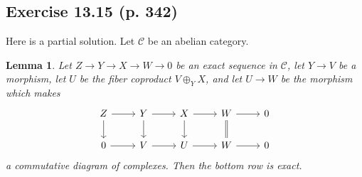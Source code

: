 \documentclass[12pt]{article}%
\newtheorem{lem}[thm]{Lemma}
\theoremstyle{remark}
\theoremstyle{definition}
\newcommand{\C}{\mathcal C}
\begin{document}

\subsection{Exercise 13.15 (p. 342)}

Here is a partial solution. Let $\C$ be an abelian category. %

\begin{lem}\label{738}
Let $Z\to Y\to X\to W\to0$ be an exact sequence in $\C$, let $Y\to V$ be a morphism, let $U$ be the fiber coproduct $V\oplus_YX$, and let $U\to W$ be the morphism which makes 
$$
\begin{tikzcd}
Z\ar{d}\ar{r}&Y\ar{d}\ar{r}&X\ar{d}\ar{r}&W\ar[equal]{d}\ar{r}&0\\ 
0\ar{r}&V\ar{r}&U\ar{r}&W\ar{r}&0
\end{tikzcd}
$$ 
a commutative diagram of complexes. Then the bottom row is exact.
\end{lem}
\end{document}
